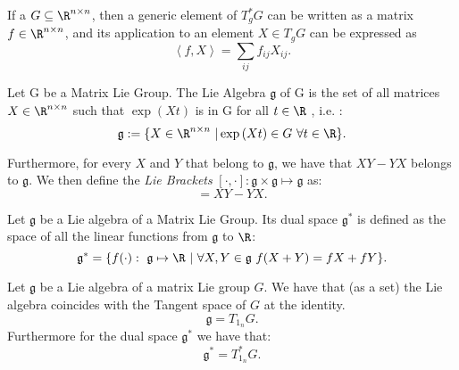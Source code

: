 \begin{remark}
\label{rem:matrixReprOfDualTangent}
If a $G \subseteq \R^{n \times n}$, then a generic element of $T_g^* G$ can be written as a matrix $f \in \R^{n \times n}$, and its application to an element $X \in T_g G$ can be expressed as
\begin{equation}
   \left< f, X \right> = \sum_{ij} f_{ij} X_{ij} .
\end{equation}
\end{remark}




\begin{definition}
Let G be a Matrix Lie Group. The Lie Algebra $\mathfrak{g}$ of G is the set of all matrices $X \in \R^{n \times n}$ such that $\exp{(Xt)}$ is in G for all $t \in \R$ , i.e. : 
\begin{equation}
   \mathfrak{g} := \{ X \in \R^{n\times n} \ | \exp{(X t)} \in G \ \forall  t \in \R \}.
\end{equation}

Furthermore, for every $X$ and $Y$ that belong to $\mathfrak{g}$, we have that $XY-YX$ belongs to $\mathfrak{g}$. We then define the \emph{Lie Brackets} $[\cdot,\cdot] : \mathfrak{g} \times \mathfrak{g} \mapsto \mathfrak{g}$ as: 
\begin{equation}
 [X,Y] = XY - YX .
\end{equation}
\end{definition}

\begin{definition}
Let $\mathfrak{g}$ be a Lie algebra of a Matrix Lie Group. Its dual space $\mathfrak{g}^*$ is defined as the space of all the linear functions from $\mathfrak{g}$ to $\R$:
\begin{equation}
\mathfrak{g}^* = \{ f(\cdot) : \ \mathfrak{g} \mapsto \R \  | \  \forall X,Y \in \mathfrak{g} \ f(X+Y) = fX + fY \} .
\end{equation} 
\end{definition}

\begin{lemma}
Let $\mathfrak{g}$ be a Lie algebra of a matrix Lie group $G$. We have that (as a set) the Lie algebra coincides with the Tangent space of $G$ at the identity. 
\begin{equation}
   \mathfrak{g} = T_{1_n} G .
\end{equation}
Furthermore for the dual space $\mathfrak{g}^*$ we have that:
\begin{equation}
   \mathfrak{g}^* = T_{1_n}^* G .
\end{equation}
\end{lemma}


